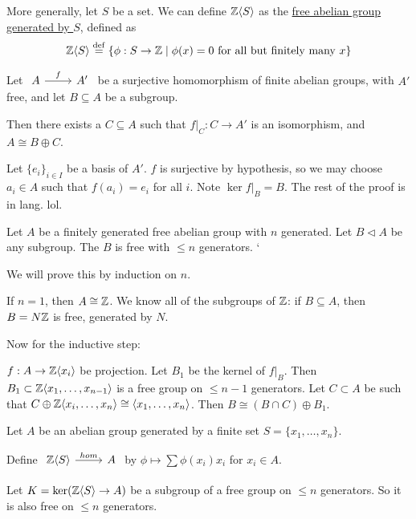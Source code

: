\documentclass[x11names,reqno,14pt]{extarticle}
\begin{document}
More generally, let $S$ be a set. We can define $\mathbb{Z}\langle S\rangle$ as the \underline{free abelian group generated by $S$}, defined as
\[
\mathbb{Z}\langle S \rangle \overset{\mathrm{def}}{=} \{\phi:S\to\mathbb{Z} \mid \phi(x) = 0\text{ for all but finitely many }x\}
\]

\lem

Let $\begin{tikzcd} A\ar[r, "f"] & A'\end{tikzcd}$ be a surjective homomorphism of finite abelian groups, with $A'$ free, and let $B \subseteq A$ be a subgroup. 

Then there exists a $C \subseteq A$ such that $f|_C:C \to A'$ is an isomorphism, and $A \cong B \oplus C$. 

\proof

Let $\{e_i\}_{i\in I}$ be a basis of $A'$. $f$ is surjective by hypothesis, so we may choose $a_i \in A$ such that $f(a_i) = e_i$ for all $i$. Note $\ker f|_B = B$. The rest of the proof is in lang. lol. 

\thm

Let $A$ be a finitely generated free abelian group with $n$ generated. Let $B \lhd A$ be any subgroup. The $B$ is free with $\leq n$ generators. `

\proof

We will prove this by induction on $n$. 

If $n = 1$, then $A \cong \mathbb{Z}$. We know all of the subgroups of $\mathbb{Z}$: if $B \subseteq A$, then $B = N\mathbb{Z}$ is free, generated by $N$. 

Now for the inductive step: 

$f:A\to \mathbb{Z}\langle x_i \rangle $ be projection. Let $B_1$ be the kernel of $f|_B$. Then $B_1 \subset \mathbb{Z} \langle x_1, \dots, x_{n - 1}\rangle$ is a free group on $\leq n - 1$ generators. Let $C \subset A$ be such that $C \oplus \mathbb{Z}\langle x_i, \dots, x_n\rangle \cong \langle x_1, \dots, x_n\rangle$. Then $B \cong (B \cap C) \oplus B_1$. 

Let $A$ be an abelian group generated by a finite set $S = \{x_1, \dots, x_n\}$. 

Define $\begin{tikzcd} \Z\langle S \rangle \ar[r, "hom"] & A \end{tikzcd}$ by $\phi \mapsto \sum\phi(x_i)x_i$ for $x_i \in A$. 

Let $K = \ker(\mathbb{Z}\langle S \rangle \to A)$ be a subgroup of a free group on $ \leq n$ generators. So it is also free on $\leq n$ generators. 

\end{document}
